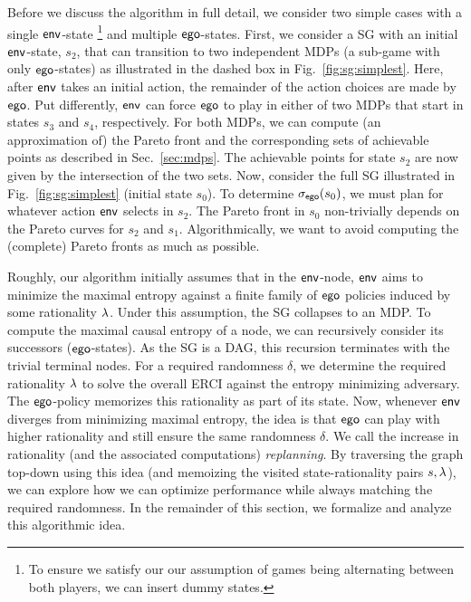 Before we discuss the algorithm in full detail, we consider two simple cases with a single $\mathsf{env}$-state \footnote{To ensure we satisfy our our assumption of games being alternating between both players, we can insert dummy states.} and multiple $\mathsf{ego}$-states.
First, we consider a SG with an initial $\mathsf{env}$-state, $s_2$, that can transition to two independent MDPs (a sub-game with only $\mathsf{ego}$-states) as illustrated in the dashed box in Fig.~\ref{fig:sg:simplest}.
Here, after $\mathsf{env}$ takes an initial action, the remainder of the action choices are made by $\mathsf{ego}$. Put differently, $\mathsf{env}$ can force $\mathsf{ego}$ to play in either of two MDPs that start in states $s_3$ and $s_4$, respectively.
For both MDPs, we can compute (an approximation of) the Pareto front and the corresponding sets of achievable points as described in Sec.~\ref{sec:mdps}. 
The achievable points for state $s_2$ are now given by the intersection of the two  sets.
Now, consider the full SG illustrated in Fig.~\ref{fig:sg:simplest} (initial state $s_0$). 
To determine ${\sigma_{\mathsf{ego}}}(s_0)$, we must plan for whatever action $\mathsf{env}$ selects in $s_2$. The Pareto front in $s_0$ non-trivially depends on the Pareto curves for $s_2$ and $s_1$. Algorithmically, we want to avoid computing the (complete) Pareto fronts as much as possible.
 
Roughly, our algorithm initially assumes that in the $\mathsf{env}$-node,
$\mathsf{env}$ aims to minimize the maximal entropy against a finite family
of $\mathsf{ego}$ policies induced by some rationality $\lambda$.
Under this assumption, the SG collapses to an MDP. To compute the maximal causal
entropy of a node, we can recursively consider its successors
($\mathsf{ego}$-states). As the SG is a DAG, this recursion terminates with
the trivial terminal nodes.  For a required randomness $\delta$, we
determine the required rationality $\lambda$ to solve the overall ERCI
against the entropy minimizing adversary. The $\mathsf{ego}$-policy memorizes this
rationality as part of its state.
Now, whenever $\mathsf{env}$ diverges from minimizing maximal entropy, the idea is that
$\mathsf{ego}$ can play with higher rationality and still ensure the same
randomness $\delta$. We call the increase in rationality (and the
associated computations) \emph{replanning}.  By traversing the graph
top-down using this idea (and memoizing the visited state-rationality
pairs $s,\lambda$), we can explore how we can optimize performance while
always matching the required randomness.  In the remainder of this
section, we formalize and analyze this algorithmic idea.


